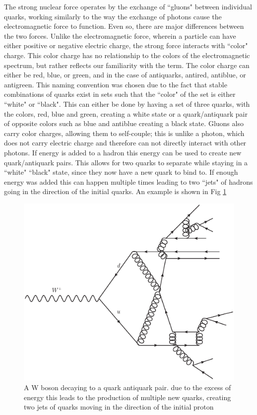 	The strong nuclear force operates by the exchange of ``gluons" between individual quarks, working similarly to the way the exchange of photons cause the electromagnetic force to function. Even so, there are major differences between the two forces. Unlike the electromagnetic force, wherein a particle can have either positive or negative electric charge, the strong force interacts with ``color" charge. This color charge has no relationship to the colors of the electromagnetic spectrum, but rather reflects our familiarity with the term.  The color charge can either be red, blue, or green, and in the case of antiquarks, antired, antiblue, or antigreen. This naming convention was chosen due to the fact that stable combinations of quarks exist in sets such that the ``color" of the set is either ``white" or ``black". This can either be done by having a set of three quarks, with the colors, red, blue and green, creating a white state or a quark/antiquark pair of opposite colors such as blue and antiblue creating a black state. Gluons also carry color charges, allowing them to self-couple; this is unlike a photon, which does not carry electric charge and therefore can not directly interact with other photons. If energy is added to a hadron this energy can be used to create new quark/antiquark pairs. This allows for two quarks to separate while staying in a ``white" ``black" state, since they now have a new quark to bind to. If enough energy was added this can happen multiple times leading to two ``jets" of hadrons going in the direction of the  initial quarks. An example is shown in Fig \ref{fig:JetFormationExample}
	
    
    \begin{figure}[!htbp]
        \centering
        \includegraphics[width=\textwidth]{figures/TheoryFigures/WComplexNew.eps}
        \caption[Jet Formation Example]{A W boson decaying to a quark antiquark pair. due to the excess of energy this leads to the production of multiple new quarks, creating two jets of quarks moving in the direction of the initial proton}
        \label{fig:JetFormationExample}
    \end{figure}{}
    
